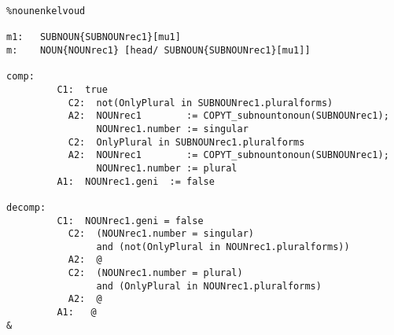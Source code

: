 \begin{verbatim}
%nounenkelvoud

m1:   SUBNOUN{SUBNOUNrec1}[mu1]
m:    NOUN{NOUNrec1} [head/ SUBNOUN{SUBNOUNrec1}[mu1]]

comp:    
         C1:  true
           C2:  not(OnlyPlural in SUBNOUNrec1.pluralforms)
           A2:  NOUNrec1        := COPYT_subnountonoun(SUBNOUNrec1);
                NOUNrec1.number := singular
           C2:  OnlyPlural in SUBNOUNrec1.pluralforms
           A2:  NOUNrec1        := COPYT_subnountonoun(SUBNOUNrec1);
                NOUNrec1.number := plural
         A1:  NOUNrec1.geni  := false

decomp:  
         C1:  NOUNrec1.geni = false
           C2:  (NOUNrec1.number = singular) 
                and (not(OnlyPlural in NOUNrec1.pluralforms))
           A2:  @
           C2:  (NOUNrec1.number = plural) 
                and (OnlyPlural in NOUNrec1.pluralforms)
           A2:  @
         A1:   @
&
\end{verbatim}
\newpage
